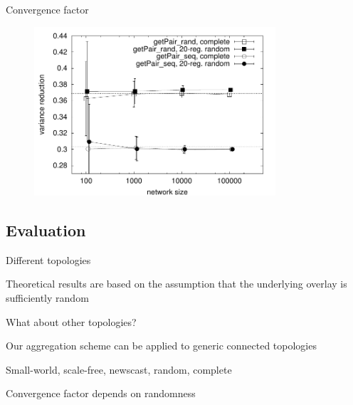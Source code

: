 \begin{frame}{Convergence factor}

\begin{figure}
	\includegraphics[width=0.80\textwidth]{rate-av}
\end{figure}

\end{frame}

\subsection{Evaluation}

\begin{frame}{Different topologies}
	
\BIL
\item Theoretical results are based on the assumption that the underlying overlay is  sufficiently random
\item What about other topologies?
\BI
\item Our aggregation scheme can be applied to generic connected topologies
\item Small-world, scale-free, newscast, random, complete
\item Convergence factor depends on randomness
\EI
\EIL
\end{frame}

